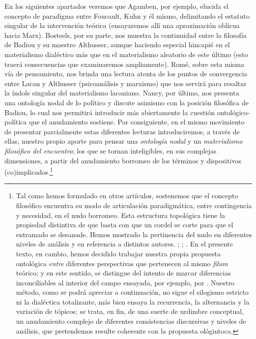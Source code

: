 En los siguientes apartados veremos que Agamben, por ejemplo, elucida el concepto de paradigma entre Foucault, Kuhn y él mismo, delimitando el estatuto singular de la intervención teórica (ensayaremos allí una aproximación oblicua hacia Marx). Bosteels, por su parte, nos muestra la continuidad entre la filosofía de Badiou y su maestro Althusser, aunque haciendo especial hincapié en el materialismo dialéctico más que en el materialismo aleatorio de este último (esto traerá consecuencias que examinaremos ampliamente). Romé, sobre esta misma vía de pensamiento, nos brinda una lectura atenta de los puntos de convergencia entre Lacan y Althusser (psicoanálisis y marxismo) que nos servirá para resaltar la índole singular del materialismo lacaniano. Nancy, por último, nos presenta una ontología nodal de lo político y discute asimismo con la posición filosófica de Badiou, lo cual nos permitirá introducir más abiertamente la cuestión ontológico-política que el anudamiento sostiene. Por consiguiente, en el mismo movimiento de presentar parcialmente estas diferentes lecturas introduciremos, a través de ellas, nuestro propio aporte para pensar una \emph{ontología nodal} y un \emph{materialismo filosófico del encuentro}; los que se tornan inteligibles, en sus complejas dimensiones, a partir del anudamiento borromeo de los términos y dispositivos (co)implicados.\footnote{Tal como hemos formulado en otros artículos, sostenemos que el concepto filosófico encuentra su modo de articulación paradigmática, entre contingencia y necesidad, en el nudo borromeo. Esta estructura topológica tiene la propiedad distintiva de que basta con que un cordel se corte para que el entramado  se desanude. Hemos mostrado la pertinencia del nudo en diferentes niveles de análisis y en referencia a distintos autores. \cite[Véase][]{@7131-FARRAN2009}; \cite[][]{@7132-FARRANSIN}; \cite[][]{@7133-FARRAN2010}. En el presente texto, en cambio, hemos decidido trabajar nuestra propia propuesta ontológica \emph{entre} diferentes perspectivas que pertenecen al mismo \emph{filum} teórico; y en este sentido, se distingue del intento de marcar diferencias inconciliables al interior del campo ensayada, por ejemplo, por \cite[][]{@7078-LACLAU2008}. Nuestro método, como se podrá apreciar a continuación, no sigue el silogismo estricto ni la dialéctica totalizante, más bien ensaya la recurrencia, la alternancia y la variación de tópicos; se trata, en fin, de una suerte de urdimbre conceptual, un anudamiento complejo de diferentes consistencias discursivas y niveles de análisis, que pretendemos resulte coherente con la propuesta ológintoca.}

